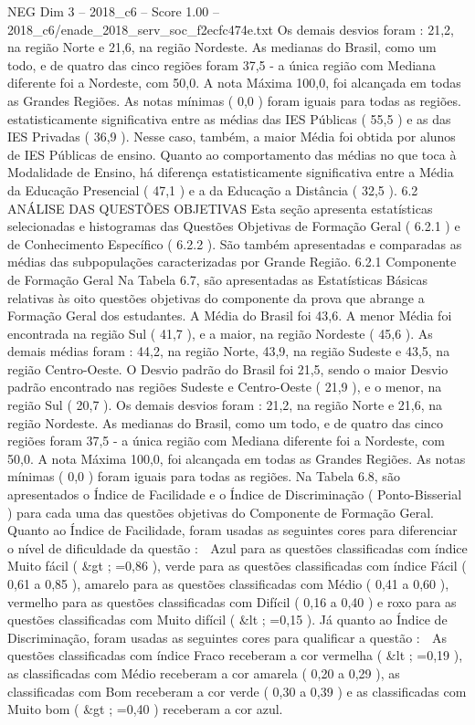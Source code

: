 \begin{textsample}{NEG Dim 3 – 2018\_c6 – Score 1.00 – 2018\_c6/enade\_2018\_serv\_soc\_f2ecfc474e.txt}
Os demais desvios foram : 21,2, na região Norte e 21,6, na região Nordeste.
As medianas do Brasil, como um todo, e de quatro das cinco regiões foram 37,5 - a única região com Mediana diferente foi a Nordeste, com 50,0.
A nota Máxima 100,0, foi alcançada em todas as Grandes Regiões.
As notas mínimas ( 0,0 ) foram iguais para todas as regiões. estatisticamente significativa entre as médias das IES Públicas ( 55,5 ) e as das IES Privadas ( 36,9 ).
Nesse caso, também, a maior Média foi obtida por alunos de IES Públicas de ensino.
Quanto ao comportamento das médias no que toca à Modalidade de Ensino, há diferença estatisticamente significativa entre a Média da Educação Presencial ( 47,1 ) e a da Educação a Distância ( 32,5 ). 6.2 ANÁLISE DAS QUESTÕES OBJETIVAS Esta seção apresenta estatísticas selecionadas e histogramas das Questões Objetivas de Formação Geral ( 6.2.1 ) e de Conhecimento Específico ( 6.2.2 ).
São também apresentadas e comparadas as médias das subpopulações caracterizadas por Grande Região. 6.2.1 Componente de Formação Geral Na Tabela 6.7, são apresentadas as Estatísticas Básicas relativas às oito questões objetivas do componente da prova que abrange a Formação Geral dos estudantes.
A Média do Brasil foi 43,6.
A menor Média foi encontrada na região Sul ( 41,7 ), e a maior, na região Nordeste ( 45,6 ).
As demais médias foram : 44,2, na região Norte, 43,9, na região Sudeste e 43,5, na região Centro-Oeste.
O Desvio padrão do Brasil foi 21,5, sendo o maior Desvio padrão encontrado nas regiões Sudeste e Centro-Oeste ( 21,9 ), e o menor, na região Sul ( 20,7 ).
Os demais desvios foram : 21,2, na região Norte e 21,6, na região Nordeste.
As medianas do Brasil, como um todo, e de quatro das cinco regiões foram 37,5 - a única região com Mediana diferente foi a Nordeste, com 50,0.
A nota Máxima 100,0, foi alcançada em todas as Grandes Regiões.
As notas mínimas ( 0,0 ) foram iguais para todas as regiões.
Na Tabela 6.8, são apresentados o Índice de Facilidade e o Índice de Discriminação ( Ponto-Bisserial ) para cada uma das questões objetivas do Componente de Formação Geral.
Quanto ao Índice de Facilidade, foram usadas as seguintes cores para diferenciar o nível de dificuldade da questão :  Azul para as questões classificadas com índice Muito fácil ( \&gt ; =0,86 ), verde para as questões classificadas com índice Fácil ( 0,61 a 0,85 ), amarelo para as questões classificadas com Médio ( 0,41 a 0,60 ), vermelho para as questões classificadas com Difícil ( 0,16 a 0,40 ) e roxo para as questões classificadas com Muito difícil ( \&lt ; =0,15 ).
Já quanto ao Índice de Discriminação, foram usadas as seguintes cores para qualificar a questão :  As questões classificadas com índice Fraco receberam a cor vermelha ( \&lt ; =0,19 ), as classificadas com Médio receberam a cor amarela ( 0,20 a 0,29 ), as classificadas com Bom receberam a cor verde ( 0,30 a 0,39 ) e as classificadas com Muito bom ( \&gt ; =0,40 ) receberam a cor azul.

\end{textsample}
